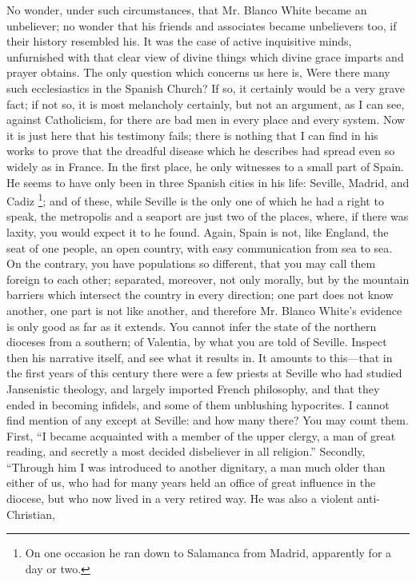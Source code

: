 No wonder, under such circumstances, that Mr. Blanco
White became an unbeliever; no wonder that his friends
and associates became unbelievers too, if their history
resembled his. It was the case of active inquisitive
minds, unfurnished with that clear view of divine things
which divine grace imparts and prayer obtains. The only
question which concerns us here is, Were there many such
ecclesiastics in the Spanish Church? If so, it certainly
would be a very grave fact; if not so, it is most
melancholy certainly, but not an argument, as I can see,
against Catholicism, for there are bad men in every place
and every system. Now it is just here that his testimony
fails; there is nothing that I can find in his works to
prove that the dreadful disease which he describes had
spread even so widely as in France. In the first place,
he only witnesses to a small part of Spain. He seems to
have only been in three Spanish cities in his life:
Seville, Madrid, and Cadiz \footnote{On one occasion he ran down to
Salamanca from Madrid, apparently for a day or two.}; and of these, while Seville is
the only one of which he had a right to speak, the
metropolis and a seaport are just two of the places,
where, if there was laxity, you would expect it to he
found. Again, Spain is not, like England, the seat of one
people, an open country, with easy communication from sea
to sea. On the contrary, you have populations so
different, that you may call them foreign to each other;
separated, moreover, not only morally, but by the
mountain barriers which intersect the country in every
direction; one part does not know another, one part is
not like another, and therefore Mr. Blanco White's
evidence is only good as far as it extends. You cannot
infer the state of the northern dioceses from a southern;
of Valentia, by what you are told of Seville. Inspect
then his narrative itself, and see what it results in. It
amounts to this—that in the first years of this
century there were a few priests at Seville who had
studied Jansenistic theology, and largely imported French
philosophy, and that they ended in becoming infidels, and
some of them unblushing hypocrites. I cannot find mention
of any except at Seville: and how many there? You may
count them. First, ``I became acquainted with a
member of the upper clergy, a man of great reading, and
secretly a most decided disbeliever in all
religion.'' Secondly, ``Through him I was
introduced to another dignitary, a man much older than
either of us, who had for many years held an office of
great influence in the diocese, but who now lived in a
very retired way. He was also a violent anti-Christian,
